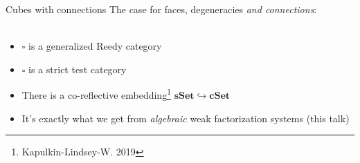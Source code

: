 \documentclass[compress]{beamer}
\let\amssquare\square
\newcommand{\cat}[1]{\mathbf{#1}}
\newcommand{\sSet}{\cat{sSet}}
\newcommand{\cSet}{\cat{cSet}}
\newcommand{\Cube}{\amssquare} %
\newcommand{\1}{\mathbf{1}}
\begin{document}
\begin{frame}{Cubes with connections}
	The case for faces, degeneracies \emph{and connections}: \\~\\
	\pause
	\begin{itemize}[<+->] \setlength{\itemsep}{15pt}
		\item $\Cube$ is a generalized Reedy category
		\item $\Cube$ is a strict test category
		\item There is a co-reflective embedding\footnote{Kapulkin-Lindsey-W. 2019} $\sSet \hookrightarrow \cSet$ 
		\item It's exactly what we get from \emph{algebraic} weak factorization systems (this talk)
	\end{itemize}
\end{frame}
\end{document}
